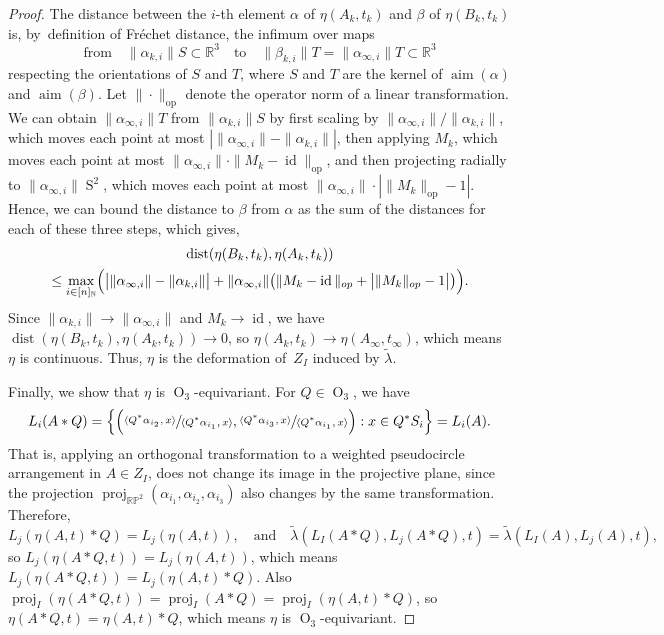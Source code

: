 \documentclass[11pt]{article}
\numberwithin{equation}{section}
\newcommand{\quand}{\quad\text{and}\quad}
\theoremstyle{remark}
\let\mb\mathbb
\DeclareMathOperator{\dist}{dist}
\DeclareMathOperator{\orth}{O}
\DeclareMathOperator{\sphere}{S}
\DeclareMathOperator{\aim}{aim}
\DeclareMathOperator{\proj}{proj}
\DeclareMathOperator{\id}{id}
\newcommand{\projplane}{\mb{RP}^2}
\begin{document}
\begin{proof}
The distance between the $i$-th element $\alpha$ of $\eta(A_k,t_k)$ and $\beta$ of $\eta(B_k,t_k)$ is, by~definition of Fréchet distance, the infimum over maps
\[
\text{from}\quad\|\alpha_{k,i}\|S \subset \mb{R}^3\quad\text{to}\quad\|\beta_{k,i}\|T = \|\alpha_{\infty,i}\|T \subset \mb{R}^3
\]
respecting the orientations of $S$ and $T$, where $S$ and $T$ are the kernel of $\aim(\alpha)$ and $\aim(\beta)$.
Let $\|\cdot\|_\text{op}$ denote the operator norm of a linear transformation.
We can obtain $\|\alpha_{\infty,i}\|T$ from $\|\alpha_{k,i}\|S$ by first scaling by $\|\alpha_{\infty,i}\|/\|\alpha_{k,i}\|$, which moves each point at most $\left| \| \alpha_{\infty,i} \| - \| \alpha_{k,i} \| \right|$, then applying $M_k$, which moves each point at most $\| \alpha_{\infty,i} \| \cdot \|M_k -\id \|_{\textrm{op}}$, and then projecting radially to $\|\alpha_{\infty,i}\| \sphere^2$, which moves each point at most $\| \alpha_{\infty,i} \| \cdot | \|M_k \|_{\textrm{op}} -1 |$. Hence, we can bound the distance to $\beta$ from $\alpha$ as the sum of the distances for each of these three steps, which gives,
\begin{multline*}
\dist(\eta(B_k,t_k), \eta(A_k,t_k))\\
\leq \max_{i \in [n]_\mb{N}} \Bigl( \bigl| \| \alpha_{\infty,i} \| - \| \alpha_{k,i} \| \bigr| +\| \alpha_{\infty,i} \| \bigl( \|M_k -\id \|_{\textrm{op}} +\bigl| \|M_k \|_{\textrm{op}} -1 \bigr| \bigr) \Bigr).
\end{multline*}
Since $\|\alpha_{k,i}\| \to \|\alpha_{\infty,i}\|$ and $M_k \to \id$, we have $\dist(\eta(B_k,t_k), \eta(A_k,t_k)) \to 0$, so
$\eta(A_k,t_k) \to \eta(A_\infty,t_\infty)$, which means $\eta$ is continuous.
Thus, $\eta$ is the deformation of~$Z_I$ induced by $\tilde \lambda$.

Finally, we show that $\eta$ is $\orth_3$-equivariant. For $Q \in \orth_3$, we have
\begin{align*}
L_i(A*Q)
= \Bigl\{ \Bigl( \frac{\langle Q^*\alpha_{i_2}, x \rangle}{\langle Q^*\alpha_{i_1}, x \rangle}, \frac{\langle Q^*\alpha_{i_3}, x \rangle}{\langle Q^*\alpha_{i_1}, x \rangle} \Bigr) :x \in Q^* S_i \Bigr\}
= L_i(A).
\end{align*}
That is, applying an orthogonal transformation to a weighted pseudocircle arrangement in $A \in Z_I$, does not change its image in the projective plane, since the projection $\proj_{\projplane}(\alpha_{i_1},\alpha_{i_2},\alpha_{i_3})$ also changes by the same transformation.
Therefore,
\[
L_j(\eta(A,t)*Q) = L_j(\eta(A,t)),\quand \tilde \lambda(L_I(A*Q),L_j(A*Q),t) = \tilde \lambda(L_I(A),L_j(A),t),
\]
so $L_j(\eta(A*Q,t)) = L_j(\eta(A,t))$, which means $L_j(\eta(A*Q,t)) = L_j(\eta(A,t)*Q)$.
Also $\proj_I(\eta(A*Q,t)) = \proj_I(A*Q) = \proj_I(\eta(A,t)*Q)$,
so $\eta(A*Q,t) = \eta(A,t)*Q$, which means $\eta$ is $\orth_3$-equivariant.
\end{proof}
\end{document}
